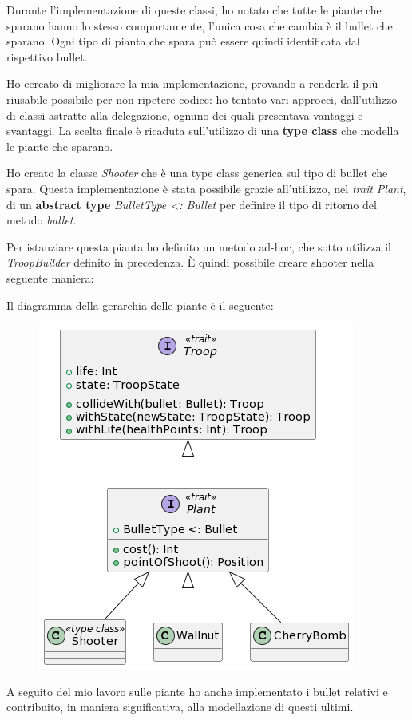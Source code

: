 Durante l'implementazione di queste classi, ho notato che tutte le piante che sparano hanno lo stesso comportamente, l'unica cosa che cambia è il bullet che sparano.
Ogni tipo di pianta che spara può essere quindi identificata dal rispettivo bullet.

Ho cercato di migliorare la mia implementazione, provando a renderla il più riusabile possibile per non ripetere codice: ho tentato vari approcci, dall'utilizzo di classi astratte alla delegazione, ognuno dei quali presentava vantaggi e svantaggi.
La scelta finale è ricaduta sull'utilizzo di una \textbf{type class} che modella le piante che sparano.

Ho creato la classe \textit{Shooter} che è una type class generica sul tipo di bullet che spara.
Questa implementazione è stata possibile grazie all'utilizzo, nel \textit{trait Plant}, di un \textbf{abstract type} \textit{BulletType \textless: Bullet} per definire il tipo di ritorno del metodo \textit{bullet}.



Per istanziare questa pianta ho definito un metodo ad-hoc, che sotto utilizza il \textit{TroopBuilder} definito in precedenza.
È quindi possibile creare shooter nella seguente maniera:



Il diagramma della gerarchia delle piante è il seguente:

\begin{figure}[H]
    \centering
    \includegraphics[width=0.8\linewidth]{images/plants.png}
    \label{Diagramma delle classi delle piante.}
\end{figure}

A seguito del mio lavoro sulle piante ho anche implementato i bullet relativi e contribuito, in maniera significativa, alla modellazione di questi ultimi.
